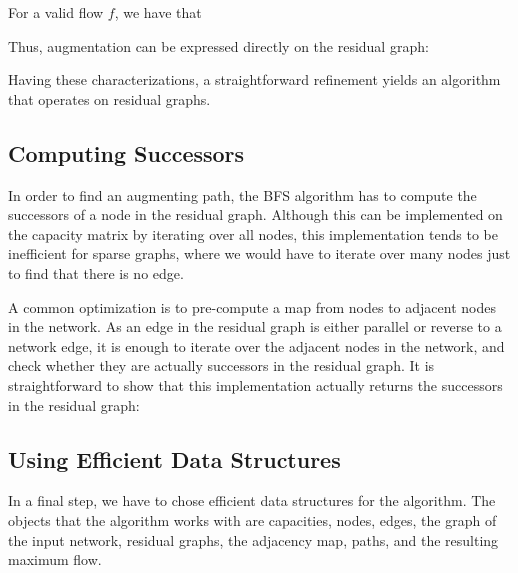 \documentclass{llncs}
\begin{document}
  For a valid flow $f$, we have that
    
  Thus, augmentation can be expressed directly on the residual graph:
  
  Having these characterizations, a straightforward refinement yields an algorithm that operates on residual graphs.

      
  \subsection{Computing Successors}
  In order to find an augmenting path, the BFS algorithm has to compute the successors of a node in the residual graph. 
  Although this can be implemented on the capacity matrix by iterating over all nodes, this implementation tends to be inefficient for sparse graphs,
  where we would have to iterate over many nodes just to find that there is no edge.
  
  A common optimization is to pre-compute a map from nodes to adjacent nodes in the network. As an edge in the residual graph is either parallel or reverse to 
  a network edge, it is enough to iterate over the adjacent nodes in the network, and check whether they are actually successors in the residual graph.
  It is straightforward to show that this implementation actually returns the successors in the residual graph:

  \subsection{Using Efficient Data Structures}\label{sec:impl_datastructures}
  In a final step, we have to chose efficient data structures for the algorithm. The objects that the algorithm works with are
  capacities, nodes, edges, the graph of the input network, residual graphs, the adjacency map, paths, and the resulting maximum flow. 
  
\end{document}
